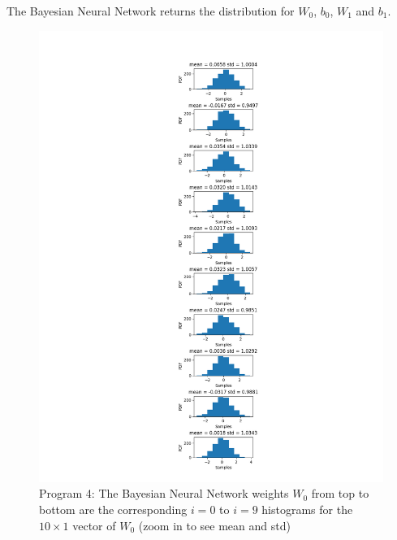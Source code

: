 \documentclass[]{article}
\begin{document}
The Bayesian Neural Network returns the distribution for $W_0$, $b_0$, $W_1$ and $b_1$.
\begin{figure}[h]
	\begin{center}
		\includegraphics[width=\textwidth]{Graph/W0_nn.png}
		\caption{Program 4: The Bayesian Neural Network weights $W_0$ from top to bottom are the corresponding $i=0$ to $i=9$ histograms for the $10\times1$ vector of $W_0$ (zoom in to see mean and std)}
	\end{center}
\end{figure}
\end{document}
